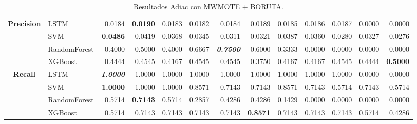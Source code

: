 \begin{table}[H]
\begin{adjustbox}{max width=12cm}
\begin{tabular}{|c|l|r|r|r|r|r|r|r|r|r|r|r|}
			\hline
			\textbf{Precision} &  LSTM &  0.0184 & \textbf{  0.0190 } &  0.0183 &  0.0182 &  0.0184 &  0.0189 &  0.0185 &  0.0186 &  0.0187 &  0.0000 &  0.0000 \\
			&  SVM & \textbf{  0.0486 } &  0.0419 &  0.0368 &  0.0345 &  0.0311 &  0.0321 &  0.0387 &  0.0360 &  0.0280 &  0.0327 &  0.0276 \\
			&  RandomForest &  0.4000 &  0.5000 &  0.4000 &  0.6667 & \textit{ \textbf{  0.7500 } } &  0.6000 &  0.3333 &  0.0000 &  0.0000 &  0.0000 &  0.0000 \\
			&  XGBoost &  0.4444 &  0.4545 &  0.4167 &  0.4545 &  0.4545 &  0.3750 &  0.4167 &  0.4167 &  0.4545 &  0.4444 & \textbf{  0.5000 } \\
			\hline
			\textbf{Recall} &  LSTM & \textit{ \textbf{  1.0000 } } &  1.0000 &  1.0000 &  1.0000 &  1.0000 &  1.0000 &  1.0000 &  1.0000 &  1.0000 &  0.0000 &  0.0000 \\
			&  SVM & \textbf{  1.0000 } &  1.0000 &  1.0000 &  0.8571 &  0.7143 &  0.7143 &  0.8571 &  0.7143 &  0.5714 &  0.7143 &  0.5714 \\
			&  RandomForest &  0.5714 & \textbf{  0.7143 } &  0.5714 &  0.2857 &  0.4286 &  0.4286 &  0.1429 &  0.0000 &  0.0000 &  0.0000 &  0.0000 \\
			&  XGBoost &  0.5714 &  0.7143 &  0.7143 &  0.7143 &  0.7143 & \textbf{  0.8571 } &  0.7143 &  0.7143 &  0.7143 &  0.5714 &  0.4286 \\
			\hline
		\end{tabular}
	\end{adjustbox}
	\caption{Resultados Adiac con MWMOTE + BORUTA.}
	\label{tab:Adiac_MWMOTE_BORUTA}
\end{table}

